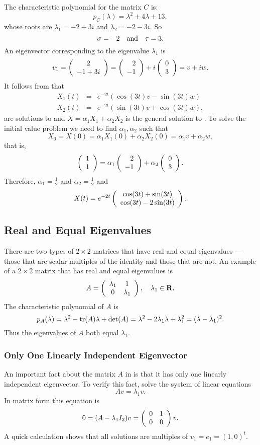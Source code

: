 The characteristic polynomial for the
matrix $C$ is:
\[
p_C(\lambda) = \lambda^2 +4\lambda + 13,
\]
whose roots are $\lambda_1 = -2+3i$ and $\lambda_2 = -2-3i$. So
\[
\sigma = -2 \quad\mbox{and}\quad \tau = 3.
\]
An eigenvector corresponding to the eigenvalue $\lambda_1$ is
\[
v_1 = \left(\begin{array}{c} 2 \\ -1+3i\end{array}\right) = \left(\begin{array}{r} 2 \\ -1\end{array}\right)+i\left(\begin{array}{r} 0 \\ 3\end{array}\right)=v+iw.
\]
It follows from  that
\[
\begin{array}{rcl}
X_1(t) & = & e^{-2t}(\cos(3t)v -\sin(3t)w)\\
X_2(t) & = & e^{-2t}(\sin(3t)v +\cos(3t)w),
\end{array}
\]
are solutions to  and $X=\alpha_1X_1+\alpha_2X_2$ is
the general solution to .  To solve the initial value
problem we need to find $\alpha_1,\alpha_2$ such that
\[
X_0 = X(0) = \alpha_1X_1(0) + \alpha_2X_2(0) = \alpha_1 v + \alpha_2 w,
\]
that is,
\[
\left(\begin{array}{r} 1 \\ 1\end{array}\right) = \alpha_1\left(\begin{array}{r} 2 \\ -1\end{array}\right)  + \alpha_2\left(\begin{array}{r} 0 \\ 3\end{array}\right).
\]
Therefore, $\alpha_1 = \frac{1}{2}$ and $\alpha_2=\frac{1}{2}$ and
\begin{equation}  \label{e:complexexampleans}
X(t) =  e^{-2t}\left(\begin{array}{c} \cos(3t)+\sin(3t) \\ \cos(3t)-2\sin(3t)\end{array}\right).
\end{equation}

\subsection*{Real and Equal Eigenvalues}

There are two types of $2\times 2$ matrices that have real and equal
eigenvalues --- those that are scalar multiples of the identity and those
that are not.  An example of a $2\times 2$ matrix that has real and equal
eigenvalues is
\begin{equation}  \label{E:equalex}
A = \left(\begin{array}{cc} \lambda_1 & 1\\ 0 &\lambda_1\end{array}\right), \quad \lambda_1\in\mbox{$\bf{R}$}.
\end{equation}
The characteristic polynomial of $A$ is
\[
p_A(\lambda) = \lambda^2 - {\rm tr}(A)\lambda + \det(A) =
\lambda^2 -2\lambda_1\lambda + \lambda_1^2 = (\lambda-\lambda_1)^2.
\]
Thus the eigenvalues of $A$ both equal $\lambda_1$.

\subsubsection*{Only One Linearly Independent Eigenvector}

An important fact about the matrix $A$ in  is that it has
only one linearly independent eigenvector.  To verify this fact, solve the
system of linear equations
\[
Av = \lambda_1v.
\]
In matrix form this equation is
\[
0 = (A-\lambda_1I_2)v = \left(\begin{array}{rr} 0 & 1\\ 0 &0\end{array}\right)v.
\]
A quick calculation shows that all solutions are multiples of
$v_1=e_1=(1,0)^t$.


